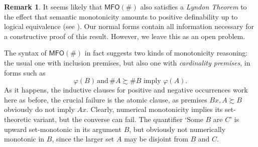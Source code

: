 \documentclass[12pt,oneside,reqno]{amsart}
\theoremstyle{definition}
\newtheorem{remark}{Remark}
\begin{document}
\begin{remark} It seems likely that $\mathsf{MFO(\#)}$ also satisfies a \emph{Lyndon Theorem} to the effect that semantic monotonicity amounts to positive definability up to logical equivalence (see \citealt{vanBenthem1991,IcardMossTune2017}). Our normal forms contain all information necessary for a constructive proof of  this result. However, we leave this as an open problem. \end{remark}

The syntax of $\mathsf{MFO(\#)}$ in fact suggests two kinds of monotonicity reasoning: the usual one with inclusion  premises, but also one with \emph{cardinality premises}, in forms such as
$$\varphi(B) \, \text{and}\, \# A \succsim \#B \,\, \text{imply}  \,\,  \varphi(A).$$ As it happens, the  inductive clauses for positive and negative occurrences  work here as before, the crucial failure is the atomic clause, as premises $Bx, A \succsim B$ obviously do not imply $Ax$. Clearly, numerical monotonicity implies its set-theoretic variant, but the converse can fail. The quantifier `Some $B$ are $C$' is upward set-monotonic in its argument $B$, but obviously not numerically monotonic in $B$, since the larger set $A$ may be disjoint from $B$ and $C$.
\end{document}

